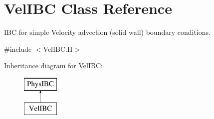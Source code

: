 \hypertarget{class_vel_i_b_c}{\section{Vel\-I\-B\-C Class Reference}
\label{class_vel_i_b_c}
}


I\-B\-C for simple Velocity advection (solid wall) boundary conditions.  




{\ttfamily \#include $<$Vel\-I\-B\-C.\-H$>$}

Inheritance diagram for Vel\-I\-B\-C\-:\begin{figure}[H]
\begin{center}
\leavevmode
\includegraphics[height=2.000000cm]{class_vel_i_b_c}
\end{center}
\end{figure}
